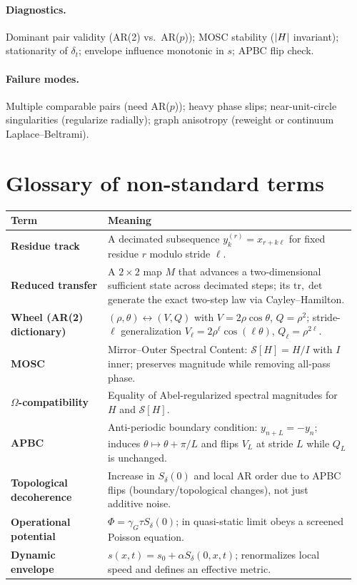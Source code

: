 \documentclass[12pt]{article}
\theoremstyle{definition}
\newcommand{\tr}{\mathrm{tr}}
\DeclarePairedDelimiter{\abs}{\lvert}{\rvert}
\begin{document}
\paragraph{Diagnostics.} Dominant pair validity (AR(2) vs.\ AR($p$)); MOSC stability ($\abs{H}$ invariant); stationarity of $\delta_t$; envelope influence monotonic in $s$; APBC flip check.

\paragraph{Failure modes.} Multiple comparable pairs (need AR($p$)); heavy phase slips; near-unit-circle singularities (regularize radially); graph anisotropy (reweight or continuum Laplace--Beltrami).

\section{Glossary of non-standard terms}
\begin{longtable}{@{}p{0.27\linewidth}p{0.69\linewidth}@{}}
\toprule
Term & Meaning \\ \midrule
\textbf{Residue track} & A decimated subsequence $y_k^{(r)}=x_{r+k\ell}$ for fixed residue $r$ modulo stride $\ell$.\\
\textbf{Reduced transfer} & A $2\times2$ map $M$ that advances a two-dimensional sufficient state across decimated steps; its $\tr,\det$ generate the exact two-step law via Cayley--Hamilton.\\
\textbf{Wheel (AR(2) dictionary)} & $(\rho,\theta)\leftrightarrow(V,Q)$ with $V=2\rho\cos\theta$, $Q=\rho^2$; stride-$\ell$ generalization $V_\ell=2\rho^\ell\cos(\ell\theta)$, $Q_\ell=\rho^{2\ell}$.\\
\textbf{MOSC} & Mirror--Outer Spectral Content: $\mathcal S[H]=H/I$ with $I$ inner; preserves magnitude while removing all-pass phase.\\
\textbf{$\Omega$-compatibility} & Equality of Abel-regularized spectral magnitudes for $H$ and $\mathcal S[H]$.\\
\textbf{APBC} & Anti-periodic boundary condition: $y_{n+L}=-y_n$; induces $\theta\mapsto\theta+\pi/L$ and flips $V_L$ at stride $L$ while $Q_L$ is unchanged.\\
\textbf{Topological decoherence} & Increase in $S_\delta(0)$ and local AR order due to APBC flips (boundary/topological changes), not just additive noise.\\
\textbf{Operational potential} & $\Phi=\gamma_G\tau S_\delta(0)$; in quasi-static limit obeys a screened Poisson equation.\\
\textbf{Dynamic envelope} & $s(x,t)=s_0+\alpha S_\delta(0,x,t)$; renormalizes local speed and defines an effective metric.\\
\bottomrule
\end{longtable}
\end{document}
